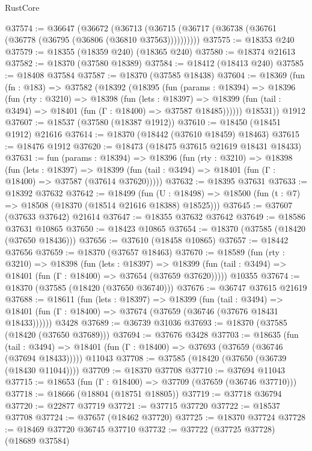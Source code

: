 \begin{lexlean}{RustCore}
\begin{coremodule}
@37574 := @36647
    (@36672 (@36713 (@36715 (@36717 (@36738 (@36761 (@36778 (@36795 (@36806 (@36810 @37563))))))))))
@37575 := @18353 @240
@37579 := @18355 (@18359 @240) (@18365 @240)
@37580 := @18374 @21613
@37582 := @18370 (@37580 @18389)
@37584 := @18412 (@18413 @240)
@37585 := @18408 @37584
@37587 := @18370 (@37585 @18438)
@37604 := @18369
    (fun (fn : @183) =>
    @37582
      (@18392
        (@18395
          (fun (params : @18394) =>
          @18396
            (fun (rty : @3210) =>
            @18398
              (fun (lets : @18397) =>
              @18399 (fun (tail : @3494) => @18401 (fun (Γ : @18400) => @37587 @18485))))))
        @18531))
    @1912
@37607 := @18537 (@37580 (@18387 @1912))
@37610 := @18450 (@18451 @1912) @21616
@37614 := @18370 (@18442 (@37610 @18459) @18463)
@37615 := @18476 @1912
@37620 := @18473 (@18475 @37615 @21619 @18431 @18433)
@37631 := fun (params : @18394) =>
  @18396
    (fun (rty : @3210) =>
    @18398
      (fun (lets : @18397) =>
      @18399 (fun (tail : @3494) => @18401 (fun (Γ : @18400) => @37587 (@37614 @37620)))))
@37632 := @18395 @37631
@37633 := @18392 @37632
@37642 := @18499
    (fun (U : @18498) => @18500 (fun (t : @7) => @18508 (@18370 (@18514 @21616 @18388) @18525)))
@37645 := @37607 (@37633 @37642) @21614
@37647 := @18355 @37632 @37642
@37649 := @18586 @37631 @10865
@37650 := @18423 @10865
@37654 := @18370 (@37585 (@18420 (@37650 @18436)))
@37656 := @37610 (@18458 @10865)
@37657 := @18442 @37656
@37659 := @18370 (@37657 @18463)
@37670 := @18589
    (fun (rty : @3210) =>
    @18398
      (fun (lets : @18397) =>
      @18399 (fun (tail : @3494) => @18401 (fun (Γ : @18400) => @37654 (@37659 @37620)))))
    @10355
@37674 := @18370 (@37585 (@18420 (@37650 @36740)))
@37676 := @36747 @37615 @21619
@37688 := @18611
    (fun (lets : @18397) =>
    @18399
      (fun (tail : @3494) =>
      @18401 (fun (Γ : @18400) => @37674 (@37659 (@36746 (@37676 @18431 @18433))))))
    @3428
@37689 := @36739 @31036
@37693 := @18370 (@37585 (@18420 (@37650 @37689)))
@37694 := @37676 @3428
@37703 := @18635
    (fun (tail : @3494) => @18401 (fun (Γ : @18400) => @37693 (@37659 (@36746 (@37694 @18433)))))
    @11043
@37708 := @37585 (@18420 (@37650 (@36739 (@18430 @11044))))
@37709 := @18370 @37708
@37710 := @37694 @11043
@37715 := @18653 (fun (Γ : @18400) => @37709 (@37659 (@36746 @37710)))
@37718 := @18666 (@18804 (@18751 @18805))
@37719 := @37718 @36794
@37720 := @22877 @37719
@37721 := @37715 @37720
@37722 := @18537 @37708
@37724 := @37657 (@18462 @37720)
@37725 := @18370 @37724
@37728 := @18469 @37720 @36745 @37710
@37732 := @37722 (@37725 @37728) (@18689 @37584)

\end{coremodule}
\end{lexlean}
